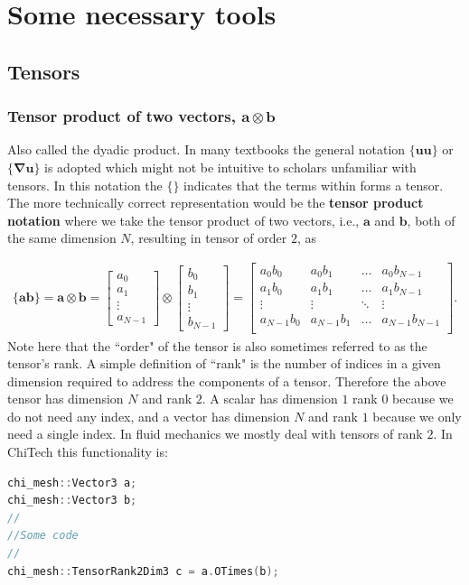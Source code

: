 \documentclass[11pt,letterpaper,titlepage]{article}
\newcommand{\beqn}{\begin{equation}
	\begin{aligned}}
\newcommand{\eeqn}{\end{aligned}
	\end{equation}}
\newcommand{\bnabla}{\boldsymbol{\nabla}}
\newcommand{\bvel}{\mathbf{u}}
\numberwithin{equation}{section}
\begin{document}
\newpage 
\section{Some necessary tools}

\subsection{Tensors}
\subsubsection{Tensor product of two vectors, $\mathbf{a}\otimes \mathbf{b}$}
Also called the dyadic product. In many textbooks the general notation $\{\bvel \bvel\}$ or $\{ \bnabla \bvel \}$ is adopted which might not be intuitive to scholars unfamiliar with tensors. In this notation the $\{\}$ indicates that the terms within forms a tensor. The more technically correct representation would be the \textbf{tensor product notation} where we take the tensor product of two vectors, i.e., $\mathbf{a}$ and $\mathbf{b}$, both of the same dimension $N$, resulting in tensor of order $2$, as

\beqn 
\{\mathbf{a} \mathbf{b} \} = 
\mathbf{a} \otimes \mathbf{b} 
=
\begin{bmatrix}
a_0 \\ a_1 \\ \vdots \\ a_{N-1}
\end{bmatrix}
\otimes 
\begin{bmatrix}
b_0 \\ b_1 \\ \vdots \\ b_{N-1}
\end{bmatrix}
=
\begin{bmatrix}
a_0 b_0 & a_0 b_1 & \hdots & a_0 b_{N-1} \\
a_1 b_0 & a_1 b_1 & \hdots & a_1 b_{N-1} \\
\vdots   & \vdots   & \ddots & \vdots \\
a_{N-1} b_0 & a_{N-1} b_1 & \hdots & a_{N-1} b_{N-1} \\
\end{bmatrix}.
\eeqn 
\newline 
Note here that the ``order" of the tensor is also sometimes referred to as the tensor's rank. A simple definition of ``rank" is the number of indices in a given dimension required to address the components of a tensor. Therefore the above tensor has dimension $N$ and rank $2$. A scalar has dimension $1$ rank $0$ because we do not need any index, and a vector has dimension $N$ and rank $1$ because we only need a single index. In fluid mechanics we mostly deal with tensors of rank $2$.
\newline
\newline
In ChiTech this functionality is:
\begin{lstlisting}[language=c++]
chi_mesh::Vector3 a;
chi_mesh::Vector3 b;
//
//Some code
//
chi_mesh::TensorRank2Dim3 c = a.OTimes(b);
\end{lstlisting}
\end{document}
